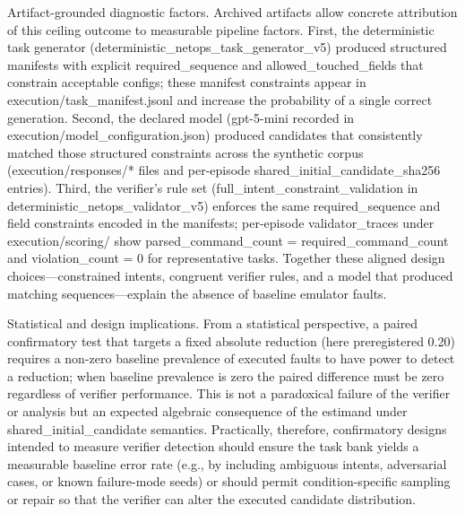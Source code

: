 \documentclass[conference]{IEEEtran}
\begin{document}
Artifact-grounded diagnostic factors. Archived artifacts allow concrete attribution of this ceiling outcome to measurable pipeline factors. First, the deterministic task generator (deterministic\_netops\_task\_generator\_v5) produced structured manifests with explicit required\_sequence and allowed\_touched\_fields that constrain acceptable configs; these manifest constraints appear in execution/task\_manifest.jsonl and increase the probability of a single correct generation. Second, the declared model (gpt-5-mini recorded in execution/model\_configuration.json) produced candidates that consistently matched those structured constraints across the synthetic corpus (execution/responses/* files and per-episode shared\_initial\_candidate\_sha256 entries). Third, the verifier's rule set (full\_intent\_constraint\_validation in deterministic\_netops\_validator\_v5) enforces the same required\_sequence and field constraints encoded in the manifests; per-episode validator\_traces under execution/scoring/ show parsed\_command\_count = required\_command\_count and violation\_count = 0 for representative tasks. Together these aligned design choices---constrained intents, congruent verifier rules, and a model that produced matching sequences---explain the absence of baseline emulator faults.

Statistical and design implications. From a statistical perspective, a paired confirmatory test that targets a fixed absolute reduction (here preregistered 0.20) requires a non-zero baseline prevalence of executed faults to have power to detect a reduction; when baseline prevalence is zero the paired difference must be zero regardless of verifier performance. This is not a paradoxical failure of the verifier or analysis but an expected algebraic consequence of the estimand under shared\_initial\_candidate semantics. Practically, therefore, confirmatory designs intended to measure verifier detection should ensure the task bank yields a measurable baseline error rate (e.g., by including ambiguous intents, adversarial cases, or known failure-mode seeds) or should permit condition-specific sampling or repair so that the verifier can alter the executed candidate distribution.
\end{document}
